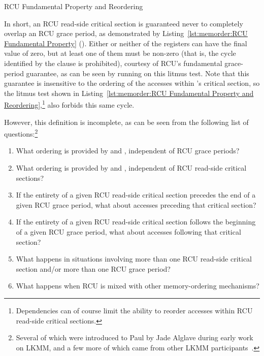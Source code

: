 \begin{listing}[tb]

\caption{RCU Fundamental Property and Reordering}
\label{lst:memorder:RCU Fundamental Property and Reordering}
\end{listing}

In short, an RCU read-side critical section is guaranteed never to
completely overlap an RCU grace period, as demonstrated by
Listing~\ref{lst:memorder:RCU Fundamental Property}
().
Either or neither of the  registers can have the final value of zero,
but at least one of them must be non-zero (that is, the cycle identified
by the  clause is prohibited), courtesy of RCU's fundamental
grace-period guarantee, as can be seen by running  on this litmus test.
Note that this guarantee is insensitive to the ordering of the accesses
within 's critical section, so the litmus test shown in
Listing~\ref{lst:memorder:RCU Fundamental Property and Reordering},\footnote{
	Dependencies can of course limit the ability to reorder accesses
	within RCU read-side critical sections.}
also forbids this same cycle.

However, this definition is incomplete, as can be seen from the following
list of questions:\footnote{
	Several of which were introduced to Paul by Jade Alglave during
	early work on LKMM, and a few more of which came from other
	LKMM participants~\cite{Alglave:2018:FSC:3173162.3177156}.}

\begin{enumerate}
\item	What ordering is provided by 
	and , independent of RCU grace periods?
\item	What ordering is provided by 
	and , independent of RCU read-side
	critical sections?
\item	If the entirety of a given RCU read-side critical section
	precedes the end of a given RCU grace period, what about
	accesses preceding that critical section?
\item	If the entirety of a given RCU read-side critical section
	follows the beginning of a given RCU grace period, what about
	accesses following that critical section?
\item	What happens in situations involving more than one RCU read-side
	critical section and/or more than one RCU grace period?
\item	What happens when RCU is mixed with other memory-ordering
	mechanisms?
\end{enumerate}

